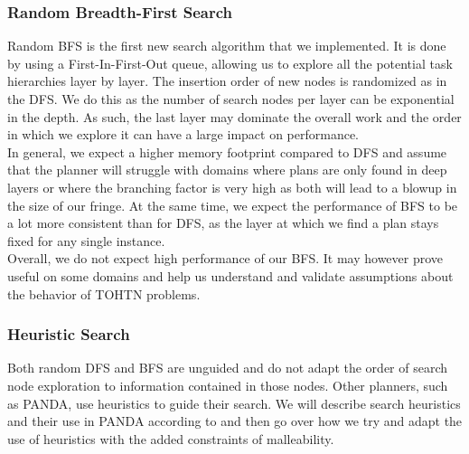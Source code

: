 \subsubsection{Random Breadth-First Search}
Random BFS is the first new search algorithm that we implemented. It is done by using a First-In-First-Out queue, allowing us to explore all the potential task hierarchies layer by layer. The insertion order of new nodes is randomized as in the DFS. We do this as the number of search nodes per layer can be exponential in the depth. As such, the last layer may dominate the overall work and the order in which we explore it can have a large impact on performance. \\
In general, we expect a higher memory footprint compared to DFS and assume that the planner will struggle with domains where plans are only found in deep layers or where the branching factor is very high as both will lead to a blowup in the size of our fringe. At the same time, we expect the performance of BFS to be a lot more consistent than for DFS, as the layer at which we find a plan stays fixed for any single instance. \\
Overall, we do not expect high performance of our BFS. It may however prove useful on some domains and help us understand and validate assumptions about the behavior of TOHTN problems.

\subsubsection{Heuristic Search}
Both random DFS and BFS are unguided and do not adapt the order of search node exploration to information contained in those nodes. Other planners, such as PANDA, use heuristics to guide their search. We will describe search heuristics and their use in PANDA according to \cite{holler2020htn} and then go over how we try and adapt the use of heuristics with the added constraints of malleability.

